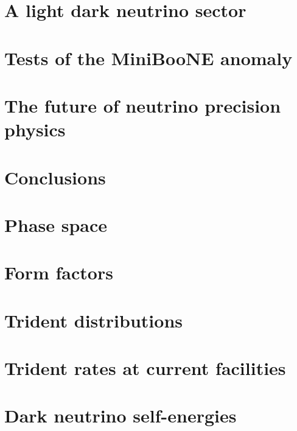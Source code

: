 \documentclass[openany,twoside,frontopenright,chaprunninghead]{ip3thesis}
\begin{document}
\chapter{A light dark neutrino sector}


\chapter{Tests of the MiniBooNE anomaly}


\chapter{The future of neutrino precision physics}
%

\chapter{Conclusions}


\appendixpageoff
\begin{appendices}
\let\clearpage\relax
\chapter{Phase space}\label{app:phase_space}


\chapter{Form factors}\label{app:form_factors}


\chapter{Trident distributions}\label{app:trident_distributions}


\chapter{Trident rates at current facilities}\label{app:rates_other}


\chapter{Dark neutrino self-energies}\label{app:loop_masses}

\end{appendices}



\end{document}
